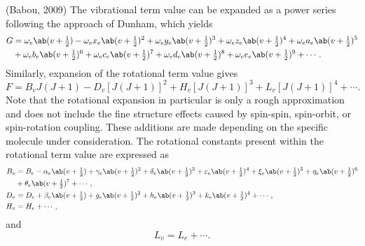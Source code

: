 \documentclass[11pt, twoside, fleqn]{report}
\begin{document}
    (Babou, 2009)
    The vibrational term value can be expanded as a power series following the approach of Dunham, which yields
    \begin{align*}
        G & = \omega_{e}\ab(v + \tfrac{1}{2}) - \omega_{e}x_{e}\ab(v + \tfrac{1}{2})^{2} + \omega_{e}y_{e}\ab(v + \tfrac{1}{2})^{3} + \omega_{e}z_{e}\ab(v + \tfrac{1}{2})^{4} + \omega_{e}a_{e}\ab(v + \tfrac{1}{2})^{5} \\
        & + \omega_{e}b_{e}\ab(v + \tfrac{1}{2})^{6} + \omega_{e}c_{e}\ab(v + \tfrac{1}{2})^{7} + \omega_{e}d_{e}\ab(v + \tfrac{1}{2})^{8} + \omega_{e}e_{e}\ab(v + \tfrac{1}{2})^{9} + \dotsb.
    \end{align*}
    Similarly, expansion of the rotational term value gives
    \begin{equation*}
        F = B_{v}J(J + 1) - D_{v}[J(J + 1)]^{2} + H_{v}[J(J + 1)]^{3} + L_{v}[J(J + 1)]^{4} + \dotsb.
    \end{equation*}
    Note that the rotational expansion in particular is only a rough approximation and does not include the fine structure effects caused by spin-spin, spin-orbit, or spin-rotation coupling. These additions are made depending on the specific molecule under consideration. The rotational constants present within the rotational term value are expressed as
    \begin{align*}
        B_{v} & = B_{e} - \alpha_{e}\ab(v + \tfrac{1}{2}) + \gamma_{e}\ab(v + \tfrac{1}{2})^{2} + \delta_{e}\ab(v + \tfrac{1}{2})^{3} + \varepsilon_{e}\ab(v + \tfrac{1}{2})^{4} + \xi_{e}\ab(v + \tfrac{1}{2})^{5} + \eta_{e}\ab(v + \tfrac{1}{2})^{6} \\
        & + \theta_{e}\ab(v + \tfrac{1}{2})^{7} + \dotsb,                                                                                                                                                                                         \\
        D_{v} & = D_{e} + \beta_{e}\ab(v + \tfrac{1}{2}) + g_{e}\ab(v + \tfrac{1}{2})^{2} + h_{e}\ab(v + \tfrac{1}{2})^{3} + k_{e}\ab(v + \tfrac{1}{2})^{4} + \dotsb,                                                                                   \\
        H_{v} & = H_{e} + \dotsb,
    \end{align*}
    and
    \begin{equation*}
        L_{v} = L_{e} + \dotsb.
    \end{equation*}
\end{document}
